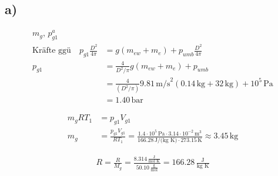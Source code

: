 

\subsection*{a)}

\begin{align*}
    m_g, \, p_{g1}^a \\
    \text{Kräfte ggü} \quad p_{g1} \frac{D^2}{4 \pi} &= g (m_{ew} + m_e) + p_{umb} \frac{D^2}{4 \pi} \\
    p_{g1} &= \frac{4}{D^2 / \pi} g (m_{ew} + m_e) + p_{umb} \\
    &= \frac{4}{(D^2 / \pi)} 9.81 \, \text{m/s}^2 (0.14 \, \text{kg} + 32 \, \text{kg}) + 10^5 \, \text{Pa} \\
    &= 1.40 \, \text{bar}
\end{align*}

\begin{align*}
    m_g R T_1 &= p_{g1} V_{g1} \\
    m_g &= \frac{p_{g1} V_{g1}}{R T_1} = \frac{1.4 \cdot 10^5 \, \text{Pa} \cdot 3.14 \cdot 10^{-2} \, \text{m}^3}{166.28 \, \text{J/(kg K)} \cdot 273.15 \, \text{K}} \approx 3.45 \, \text{kg}
\end{align*}

\begin{align*}
    R = \frac{R}{M_g} = \frac{8.314 \, \frac{\text{J}}{\text{mol K}}}{50.10 \, \frac{\text{g}}{\text{mol}}} = 166.28 \, \frac{\text{J}}{\text{kg K}}
\end{align*}